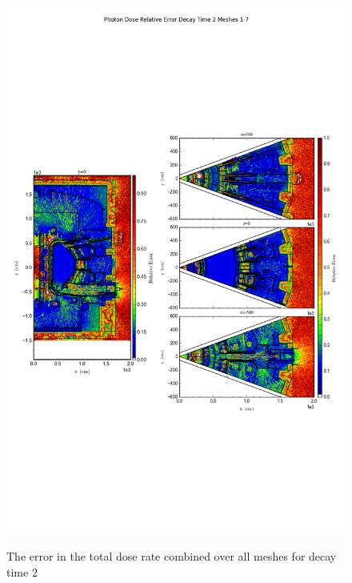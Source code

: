 \documentclass[12pt]{article}
\begin{document}
\begin{figure}[ht!]
\centering
\includegraphics[trim={0cm 9cm 0cm 10cm},clip,scale=0.75]{../plots/final_model/Photon_Dose_Relative_Error_Decay_Time_2_Meshes_1-7.png}
\label{fig:photons_dc2_b4c_total_error}
\caption{The error in the total dose rate combined over all meshes for decay time 2}
\end{figure}
\end{document}
